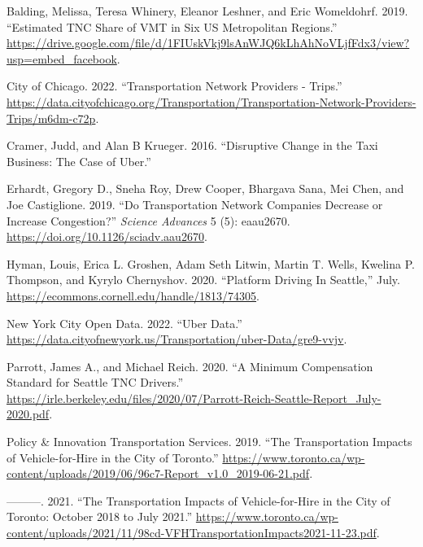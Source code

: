 \documentclass[
  letterpaper,
]{article}
\newlength{\cslhangindent}
\newlength{\cslentryspacingunit} %
\newenvironment{CSLReferences}[2] %
 {%
  \setlength{\parindent}{0pt}
  \ifodd #1
  \let\oldpar\par
  \def\par{\hangindent=\cslhangindent\oldpar}
  \fi
  \setlength{\parskip}{#2\cslentryspacingunit}
 }%
 {}
\begin{document}
\hypertarget{refs}{}
\begin{CSLReferences}{1}{0}
\leavevmode{}%
Balding, Melissa, Teresa Whinery, Eleanor Leshner, and Eric Womeldohrf.
2019. {``Estimated TNC Share of VMT in Six US Metropolitan Regions.''}
\url{https://drive.google.com/file/d/1FIUskVkj9lsAnWJQ6kLhAhNoVLjfFdx3/view?usp=embed_facebook}.

\leavevmode{}%
City of Chicago. 2022. {``Transportation Network Providers - Trips.''}
\url{https://data.cityofchicago.org/Transportation/Transportation-Network-Providers-Trips/m6dm-c72p}.

\leavevmode{}%
Cramer, Judd, and Alan B Krueger. 2016. {``Disruptive Change in the Taxi
Business: The Case of Uber.''}

\leavevmode{}%
Erhardt, Gregory D., Sneha Roy, Drew Cooper, Bhargava Sana, Mei Chen,
and Joe Castiglione. 2019. {``Do Transportation Network Companies
Decrease or Increase Congestion?''} \emph{Science Advances} 5 (5):
eaau2670. \url{https://doi.org/10.1126/sciadv.aau2670}.

\leavevmode{}%
Hyman, Louis, Erica L. Groshen, Adam Seth Litwin, Martin T. Wells,
Kwelina P. Thompson, and Kyrylo Chernyshov. 2020. {``Platform Driving In
Seattle,''} July. \url{https://ecommons.cornell.edu/handle/1813/74305}.

\leavevmode{}%
New York City Open Data. 2022. {``Uber Data.''}
\url{https://data.cityofnewyork.us/Transportation/uber-Data/gre9-vvjv}.

\leavevmode{}%
Parrott, James A., and Michael Reich. 2020. {``A Minimum Compensation
Standard for Seattle TNC Drivers.''}
\url{https://irle.berkeley.edu/files/2020/07/Parrott-Reich-Seattle-Report_July-2020.pdf}.

\leavevmode{}%
Policy \& Innovation Transportation Services. 2019. {``The
Transportation Impacts of Vehicle-for-Hire in the City of Toronto.''}
\url{https://www.toronto.ca/wp-content/uploads/2019/06/96c7-Report_v1.0_2019-06-21.pdf}.

\leavevmode{}%
---------. 2021. {``The Transportation Impacts of Vehicle-for-Hire in
the City of Toronto: October 2018 to July 2021.''}
\url{https://www.toronto.ca/wp-content/uploads/2021/11/98cd-VFHTransportationImpacts2021-11-23.pdf}.


\end{CSLReferences}
\end{document}
